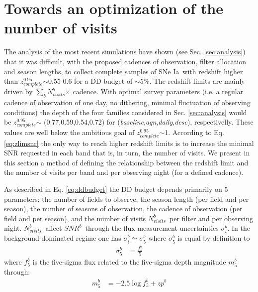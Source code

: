 \documentclass[skiphelvet,twocolumn]{lsstdescnote}
\newcommand{\snrb}{\mbox{$SNR^b$}}
\newcommand{\sne}{{SNe Ia}}
\newcommand{\zcompb}{\mbox{$z_{complete}^{0.95}$}}
\newcommand{\per}{$\%$}
\newcommand{\seq}{$\sim$}
\newcommand{\nvisitsb}{\mbox{$N_{visits}^b$}}
\newcommand{\sumnvisitsb}{\mbox{$\sum\limits_{b}N_{visits}^b$}}
\newcommand{\osfamily}[1]{{\it #1}}
\begin{document}
\section{Towards an optimization of the number of visits}
\label{sec:opti}

The analysis of the most recent simulations have shown (see Sec. \ref{sec:analysis}) that it was difficult, with the proposed cadences of observation, filter allocation and season lengths, to collect complete samples of \sne~with redshift higher than \zcompb\seq 0.55-0.6 for a DD budget of \seq 5\per.  %
The redshift limits are mainly driven by \sumnvisitsb$\times$ cadence. With optimal survey parameters (i.e. a regular cadence of observation of one day, no dithering, minimal fluctuation of observing conditions) the depth of the four families considered in Sec. \ref{sec:analysis} would be \zcompb $\sim$ (0.77,0.59,0.54,0.72) for (\osfamily{baseline},\osfamily{agn},\osfamily{daily},\osfamily{desc}), respectivelly. These values are well below the ambitious goal of \zcompb\seq1. According to Eq. \ref{eq:zlimsnr} the only way to reach higher redshift limits is to increase the minimal SNR requested in each band that is, in turn, the number of visits. We present in this section a method of defining the relationship between the redshift limit and the number of visits per band and per observing night (for a defined cadence). 
\par
As described in Eq. \ref{eq:ddbudget} the DD budget depends primarily on 5 parameters: the number of fields to observe, the season length (per field and per season), the number of seasons of observation, the cadence of observation (per field and per season), and the number of visits \nvisitsb~per filter and per observing night. \nvisitsb~affect \snrb~through the flux measurement uncertainties  $\sigma_i^b$. In the background-dominated regime one has $\sigma_i^b \simeq \sigma_5^b$ where $\sigma_5^b$ is equal by definition to
\begin{equation}
  \begin{aligned}
    \sigma_5^b &=  \frac{f_5^b}{5}
    \end{aligned}
\end{equation}
where $f_ 5^b$ is the five-sigma flux related to the five-sigma depth magnitude $m_5^b$ through:
\begin{equation}
  \begin{aligned}
    m_5^b &= -2.5 \log f_5^b+zp^b
    \end{aligned}
\end{equation}
\end{document}
